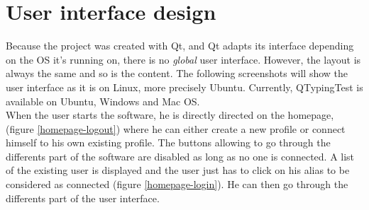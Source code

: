 \chapter{User interface design}
Because the project was created with Qt, and Qt adapts its interface depending on the OS it's running on, there is no \textit{global} user interface. However, the layout is always the same and so is the content. The following screenshots will show the user interface as it is on Linux, more precisely Ubuntu. Currently, QTypingTest is available on Ubuntu, Windows and Mac OS.\\
When the user starts the software, he is directly directed on the homepage, (figure \ref{homepage-logout}) where he can either create a new profile or connect himself to his own existing profile. The buttons allowing to go through the differents part of the software are disabled as long as no one is connected. A list of the existing user is displayed and the user just has to click on his alias to be considered as connected (figure \ref{homepage-login}). He can then go through the differents part of the user interface. 
